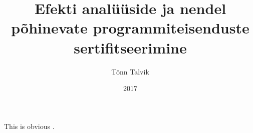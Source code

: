 \documentclass{article}
\begin{document}
\title{Efekti analüüside ja nendel põhinevate programmiteisenduste sertifitseerimine}
\author{Tõnn Talvik}
\date{2017}
\maketitle

This is obvious \cite{Benton2016}.


\newpage
\printbibliography[title={Kirjandus}]
\end{document}
